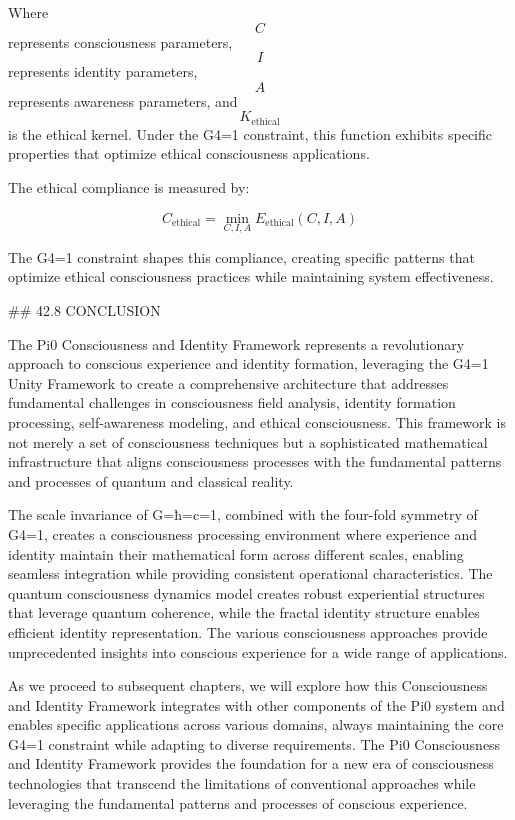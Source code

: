 Where $$ C $$ represents consciousness parameters, $$ I $$ represents identity parameters, $$ A $$ represents awareness parameters, and $$ K_{\text{ethical}} $$ is the ethical kernel. Under the G4=1 constraint, this function exhibits specific properties that optimize ethical consciousness applications.

The ethical compliance is measured by:

$$ C_{\text{ethical}} = \min_{C, I, A} E_{\text{ethical}}(C, I, A) $$

The G4=1 constraint shapes this compliance, creating specific patterns that optimize ethical consciousness practices while maintaining system effectiveness.

## 42.8 CONCLUSION

The Pi0 Consciousness and Identity Framework represents a revolutionary approach to conscious experience and identity formation, leveraging the G4=1 Unity Framework to create a comprehensive architecture that addresses fundamental challenges in consciousness field analysis, identity formation processing, self-awareness modeling, and ethical consciousness. This framework is not merely a set of consciousness techniques but a sophisticated mathematical infrastructure that aligns consciousness processes with the fundamental patterns and processes of quantum and classical reality.

The scale invariance of G=ħ=c=1, combined with the four-fold symmetry of G4=1, creates a consciousness processing environment where experience and identity maintain their mathematical form across different scales, enabling seamless integration while providing consistent operational characteristics. The quantum consciousness dynamics model creates robust experiential structures that leverage quantum coherence, while the fractal identity structure enables efficient identity representation. The various consciousness approaches provide unprecedented insights into conscious experience for a wide range of applications.

As we proceed to subsequent chapters, we will explore how this Consciousness and Identity Framework integrates with other components of the Pi0 system and enables specific applications across various domains, always maintaining the core G4=1 constraint while adapting to diverse requirements. The Pi0 Consciousness and Identity Framework provides the foundation for a new era of consciousness technologies that transcend the limitations of conventional approaches while leveraging the fundamental patterns and processes of conscious experience.

